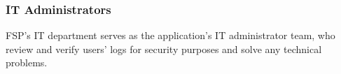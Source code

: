 \subsubsection{IT Administrators}

FSP's IT department serves as the application's IT administrator team, who review and verify users' logs for security purposes and solve any technical problems.
